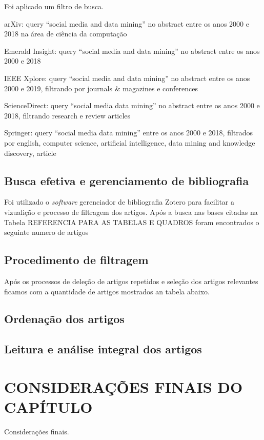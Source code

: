 

Foi aplicado um filtro de busca.

arXiv: query ``social media and data mining'' no abstract entre os anos 2000 e 2018 na área de ciência da computação

Emerald Insight: query ``social media and data mining'' no abstract entre os anos 2000 e 2018

IEEE Xplore: query ``social media and data mining'' no abstract entre os anos 2000 e 2019, filtrando por journals \& magazines e conferences

ScienceDirect: query ``social media data mining'' no abstract entre os anos 2000 e 2018, filtrando research e review articles

Springer: query ``social media data mining'' entre os anos 2000 e 2018, filtrados por english, computer science, artificial intelligence, data mining and knowledge discovery, article

\subsection{Busca efetiva e gerenciamento de bibliografia}
\label{subsec:buscaEfetivaRevisao}

Foi utilizado o \textit{software} gerenciador de bibliografia Zotero para facilitar a vizualição e processo de filtragem dos artigos. Após a busca nas bases citadas na Tabela REFERENCIA PARA AS TABELAS E QUADROS foram encontrados o seguinte numero de artigos



\subsection{Procedimento de filtragem}
\label{subsec:filtragemRevisao}

Após os processos de deleção de artigos repetidos e seleção dos artigos relevantes ficamos com a quantidade de artigos mostrados an tabela abaixo.



\subsection{Ordenação dos artigos}
\label{subsec:ordenacaoRevisao}

\subsection{Leitura e análise integral dos artigos}
\label{subsec:leituraIntegralRevisao}

\section{CONSIDERAÇÕES FINAIS DO CAPÍTULO}
\label{sec:consideracoesFinaisRevisao}
Considerações finais.